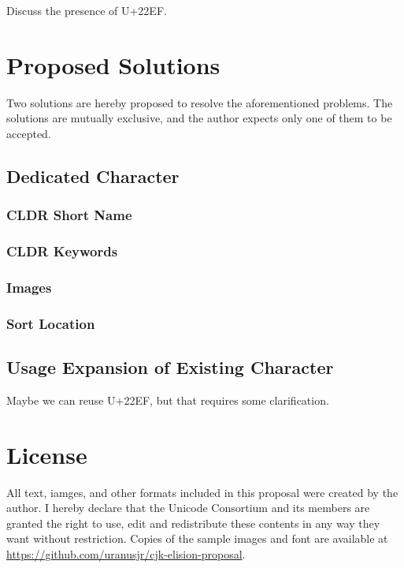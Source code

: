 \documentclass[a4paper, 12pt]{article}
\begin{document}
Discuss the presence of U+22EF.


\section{Proposed Solutions}

Two solutions are hereby proposed to resolve the aforementioned problems. The solutions are mutually exclusive, and the author expects only one of them to be accepted.


\subsection{Dedicated Character}

\subsubsection{CLDR Short Name}

\subsubsection{CLDR Keywords}

\subsubsection{Images}


\subsubsection{Sort Location}

\subsection{Usage Expansion of Existing Character}

Maybe we can reuse U+22EF, but that requires some clarification.


\section{License}

All text, iamges, and other formats included in this proposal were created by the author. I hereby declare that the Unicode Consortium and its members are granted the right to use, edit and redistribute these contents in any way they want without restriction. Copies of the sample images and font are available at \url{https://github.com/uranusjr/cjk-elision-proposal}.
\end{document}
